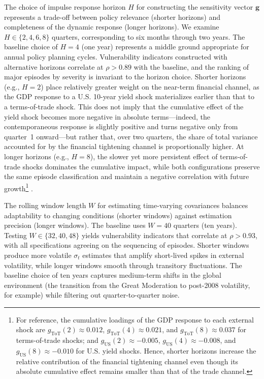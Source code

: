 \documentclass[12pt,a4paper]{article}
\numberwithin{equation}{section}
\theoremstyle{definition}
\theoremstyle{remark}
\newcommand{\vect}[1]{\boldsymbol{#1}}
\begin{document}
The choice of impulse response horizon $H$ for constructing the sensitivity vector $\vect{g}$ represents a trade-off between policy relevance (shorter horizons) and completeness of the dynamic response (longer horizons). We examine $H \in \{2, 4, 6, 8\}$ quarters, corresponding to six months through two years. The baseline choice of $H=4$ (one year) represents a middle ground appropriate for annual policy planning cycles. Vulnerability indicators constructed with alternative horizons correlate at $\rho > 0.89$ with the baseline, and the ranking of major episodes by severity is invariant to the horizon choice. Shorter horizons (e.g., $H=2$) place relatively greater weight on the near-term financial channel, as the GDP response to a U.S. 10-year yield shock materializes earlier than that to a terms-of-trade shock. This does not imply that the cumulative effect of the yield shock becomes more negative in absolute terms—indeed, the contemporaneous response is slightly positive and turns negative only from quarter~1 onward—but rather that, over two quarters, the share of total variance accounted for by the financial tightening channel is proportionally higher. At longer horizons (e.g., $H=8$), the slower yet more persistent effect of terms-of-trade shocks dominates the cumulative impact, while both configurations preserve the same episode classification and maintain a negative correlation with future growth\footnote{For reference, the cumulative loadings of the GDP response to each external shock are 
$g_{\mathrm{ToT}}(2) \approx 0.012$, $g_{\mathrm{ToT}}(4) \approx 0.021$, and 
$g_{\mathrm{ToT}}(8) \approx 0.037$ for terms-of-trade shocks; 
and $g_{\mathrm{US}}(2) \approx -0.005$, $g_{\mathrm{US}}(4) \approx -0.008$, 
and $g_{\mathrm{US}}(8) \approx -0.010$ for U.S. yield shocks. 
Hence, shorter horizons increase the relative contribution of the financial tightening channel even though its absolute cumulative effect remains smaller than that of the trade channel.}
.


The rolling window length $W$ for estimating time-varying covariances balances adaptability to changing conditions (shorter windows) against estimation precision (longer windows). The baseline uses $W=40$ quarters (ten years). Testing $W \in \{32, 40, 48\}$ yields vulnerability indicators that correlate at $\rho > 0.93$, with all specifications agreeing on the sequencing of episodes. Shorter windows produce more volatile $\sigma_t$ estimates that amplify short-lived spikes in external volatility, while longer windows smooth through transitory fluctuations. The baseline choice of ten years captures medium-term shifts in the global environment (the transition from the Great Moderation to post-2008 volatility, for example) while filtering out quarter-to-quarter noise.
\end{document}
